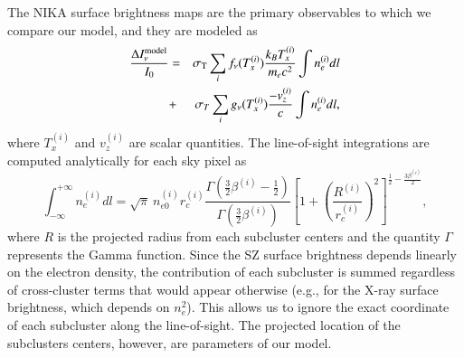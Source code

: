 \documentclass[twocolumn,traditabstract]{aa}
\begin{document}
The NIKA surface brightness maps are the primary observables to which we compare our model, and they are modeled as
\begin{eqnarray}		   
\frac{\Delta I_{\nu}^{\rm model}}{I_0} & = & \sigma_{\rm T} \sum\limits_{i} f_{\nu}(T_x^{(i)}) \frac{k_B T_x^{(i)}}{m_e c^2} \int n_e^{(i)} dl \nonumber \\
       & + & \sigma_T \sum\limits_{i} g_{\nu}(T_x^{(i)}) \frac{-v_z^{(i)}}{c} \int n_e^{(i)} dl, \nonumber \\	        
\label{eq:Inu_model}
\end{eqnarray}
where $T_x^{(i)}$ and $v_z^{(i)}$ are scalar quantities. The line-of-sight integrations are computed analytically for each sky pixel as
\begin{equation}
	\int^{+\infty}_{-\infty} n_e^{(i)} dl = \sqrt{\pi} \ n_{e0}^{(i)} r_c^{(i)}\frac{\Gamma\left(\frac{3}{2} \beta^{(i)} -\frac{1}{2}\right)}{\Gamma\left(\frac{3}{2} \beta^{(i)}\right)} \left[1+\left(\frac{R^{(i)}}{r_c^{(i)}}\right)^2 \right]^{\frac{1}{2}-\frac{3 \beta^{(i)}}{2}},
\label{eq:beta_model_integ}
\end{equation}
where $R$ is the projected radius from each subcluster centers and the quantity $\Gamma$ represents the Gamma function. Since the SZ surface brightness depends linearly on the electron density, the contribution of each subcluster is summed regardless of cross-cluster terms that would appear otherwise (e.g., for the X-ray surface brightness, which depends on $n_e^2$). This allows us to ignore the exact coordinate of each subcluster along the line-of-sight. The projected location of the subclusters centers, however, are parameters of our model.

\end{document}

